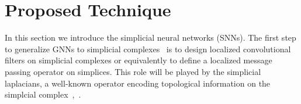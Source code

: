 \section{Proposed Technique}
In this section we introduce the simplicial neural networks (SNNs). The first step to generalize GNNs to simplicial complexes~\cite{hatcher} is to design localized convolutional filters on simplicial complexes or equivalently to define a localized message passing operator on simplices. This role will be played by the simplicial laplacians, a well-known operator encoding topological information on the simplcial complex~\cite{horak2013spectra},~\cite{eckmann1944}.




